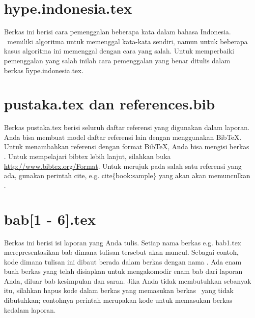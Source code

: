 \section{hype.indonesia.tex}
\label{sec:hype-indonesia-tex}
Berkas ini berisi cara pemenggalan beberapa kata dalam bahasa Indonesia.
\latex~memiliki algoritma untuk memenggal kata-kata sendiri, namun untuk beberapa kasus algoritma ini memenggal dengan cara yang salah.
Untuk memperbaiki pemenggalan yang salah inilah cara pemenggalan yang benar ditulis dalam berkas \f{hype.indonesia.tex}.


\section{pustaka.tex dan references.bib}
\label{sec:pustaka-tex}
Berkas pustaka.tex berisi seluruh daftar referensi yang digunakan dalam
laporan.
Anda bisa membuat model daftar referensi lain dengan menggunakan BibTeX. Untuk menambahkan referensi dengan format BibTeX, Anda bisa mengisi berkas .
Untuk mempelajari bibtex lebih lanjut, silahkan buka \url{http://www.bibtex.org/Format}.
Untuk merujuk pada salah satu referensi yang ada, gunakan perintah \bslash cite, e.g. \bslash cite\{book:sample\} yang akan akan memunculkan \cite{book:sample}.


\section{bab[1 - 6].tex}
\label{sec:bab-tex}
Berkas ini berisi isi laporan yang Anda tulis.
Setiap nama berkas e.g. bab1.tex merepresentasikan bab dimana tulisan tersebut akan muncul.
Sebagai contoh, kode dimana tulisan ini dibaut berada dalam berkas dengan nama .
Ada enam buah berkas yang telah disiapkan untuk mengakomodir enam bab dari laporan Anda, diluar bab kesimpulan dan saran.
Jika Anda tidak membutuhkan sebanyak itu, silahkan hapus kode dalam berkas  yang memasukan berkas \latex~yang tidak dibutuhkan; contohnya perintah  merupakan kode untuk memasukan berkas  kedalam laporan.
